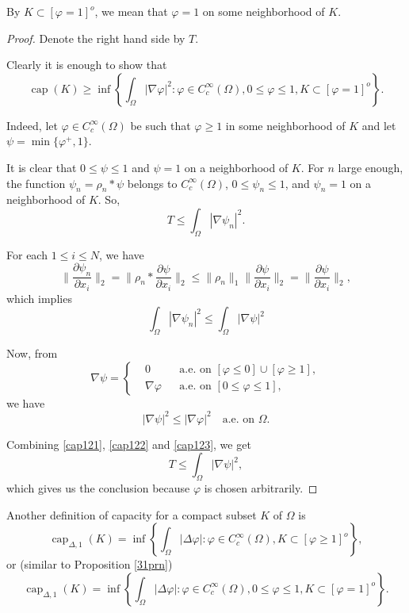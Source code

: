 \documentclass[a4paper, 11pt]{report}
\theoremstyle{definition}\newtheorem*{rmk}{Remark}
\DeclareMathOperator{\capa}{cap}
\begin{document}
By $K\subset [\varphi = 1]^o$, we mean that $\varphi = 1$ on some neighborhood of $K$.

\begin{proof}
Denote the right hand side by $T$.

Clearly it is enough to show that
\[
\capa (K) \ge \inf \left\{ \int_{\Omega} |\nabla \varphi |^2: \varphi\in C_c^{\infty}(\Omega), 0\le \varphi\le 1, K \subset [\varphi = 1]^o \right\}.
\]

Indeed, let $\varphi \in C_c^{\infty}(\Omega)$ be such that $\varphi \ge 1$ in some neighborhood of $K$ and let $\psi = \min\{\varphi^+,1\}$.

It is clear that $0\le \psi\le 1$ and $\psi = 1$ on a neighborhood of $K$. For $n$ large enough, the function $\psi_n = \rho_n * \psi$ belongs to $C_c^{\infty}(\Omega)$, $0\le \psi_n \le 1$, and $\psi_n = 1$ on a neighborhood of $K$. So,
\begin{equation}\label{cap121}
T \le \int_{\Omega}|\nabla \psi_n|^2.
\end{equation}

For each $1 \le i \le N$, we have
\[
\| \frac{\partial \psi_n}{\partial x_i} \|_2 =\| \rho_n * \frac{\partial \psi}{\partial x_i} \|_2 \le \| \rho_n \|_1 \|\frac{\partial \psi}{\partial x_i}\|_2 =  \|\frac{\partial \psi}{\partial x_i}\|_2  ,
\]
which implies
\begin{equation}\label{cap122}
\int_{\Omega}|\nabla \psi_n|^2 \le \int_{\Omega}|\nabla \psi|^2 
\end{equation}

Now, from
\[
\nabla \psi  = \left\{
\begin{aligned}
&0 &&\text{a.e.\ on }[\varphi \le 0]\cup[\varphi \ge 1],\\
&\nabla \varphi &&\text{a.e.\ on }[0 \le \varphi \le 1],
\end{aligned}
\right.
\]
we have
\begin{equation}\label{cap123}
|\nabla \psi|^2 \le |\nabla \varphi |^2 \quad\text{a.e.\ on }\Omega.
\end{equation}

Combining \eqref{cap121}, \eqref{cap122} and \eqref{cap123}, we get
\[
T \le \int_{\Omega} |\nabla \psi |^2,
\]
which gives us the conclusion because $\varphi$ is chosen arbitrarily.
\end{proof}

Another definition of capacity for a compact subset $K$ of $\Omega$ is
\[
\capa_{\Delta,1}(K) = \inf \left\{\int_{\Omega} |\Delta \varphi |: \varphi\in C_c^{\infty}(\Omega),K \subset [\varphi \ge 1]^o \right\},
\]
or (similar to Proposition \ref{31prn})
\[
\capa_{\Delta,1}(K) = \inf \left\{\int_{\Omega} |\Delta \varphi |: \varphi\in C_c^{\infty}(\Omega), 0\le\varphi\le 1, K \subset [\varphi = 1]^o\right\}.
\]
\end{document}
